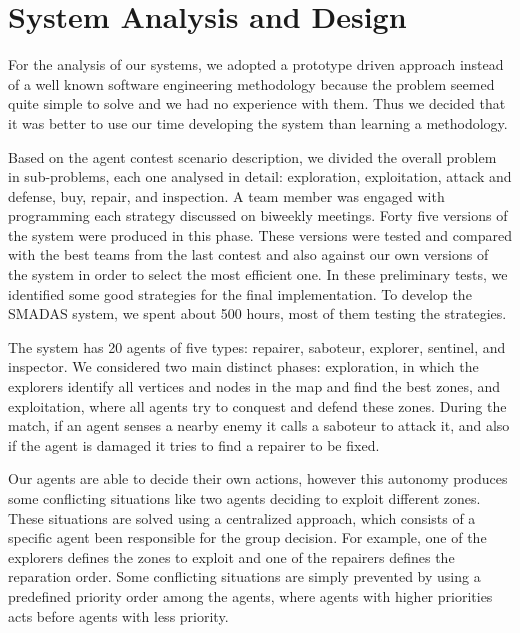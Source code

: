 
\section{System Analysis and Design}
For the analysis of our systems, we adopted a prototype driven approach instead of a well known software engineering methodology because the problem seemed quite simple to solve and we had no experience with them. Thus we decided that it was better to use our time developing the system than learning a methodology.

Based on the agent contest scenario description, we divided the overall problem in sub-problems, each one analysed in detail: exploration, exploitation, attack and defense, buy, repair, and inspection. A team member was engaged with programming each strategy discussed on biweekly meetings. Forty five versions of the system were produced in this phase. These versions were tested and compared with the best teams from the last contest \cite{dominic:2012,ettienne:2012,dekker:2012,behrens:2012} and also against our own versions of the system in order to select the most efficient one. In these preliminary tests, we identified some good strategies for the final implementation. To develop the SMADAS system, we spent about 500 hours, most of them testing the strategies.

The system has 20 agents of five types: repairer, saboteur, explorer, sentinel, and inspector. We considered two main distinct phases: exploration, in which the explorers identify all vertices and nodes in the map and find the best zones, and exploitation, where all agents try to conquest and defend these zones. During the match, if an agent senses a nearby enemy it calls a saboteur to attack it, and also if the agent is damaged it tries to find a repairer to be fixed. 

Our agents are able to decide their own actions, however this autonomy produces some conflicting situations like two agents deciding to exploit different zones. These situations are solved using a centralized approach, which consists of a specific agent been responsible for the group decision. For example, one of the explorers defines the zones to exploit and one of the repairers defines the reparation order. Some conflicting situations are simply prevented by using a predefined priority order among the agents, where agents with higher priorities acts before agents with less priority.

